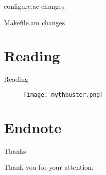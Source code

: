 \documentclass{beamer}
\begin{document}
\begin{frame}[t]{configure.ac changes}
	\begin{small}
	
	\end{small}
\end{frame}

\begin{frame}[t]{Makefile.am changes}
	\begin{small}
	
	\end{small}
\end{frame}

\section{Reading}

\begin{frame}{Reading}
	\begin{figure}
	\texttt{[image: mythbuster.png]}
	\end{figure}
\end{frame}

\section{Endnote}

\begin{frame}{Thanks}
	\begin{center}
	Thank you for your attention.
	\end{center}
\end{frame}
\end{document}
